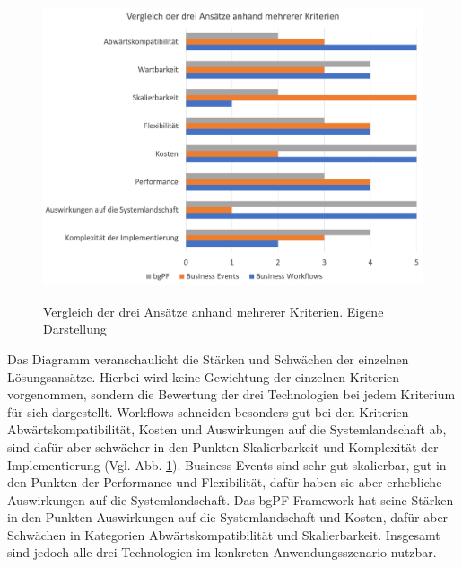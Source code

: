 \begin{figure}[H]
 \centering
 \includegraphics[height=9cm]{Bilder/Entscheidungsmatrix_Diagramm_2.png}
 \caption[Vergleich der drei Ansätze anhand mehrerer Kriterien]{Vergleich der drei Ansätze anhand mehrerer Kriterien. Eigene Darstellung}
 \label{fig:iso_norm_Diagramm}
\end{figure}

Das Diagramm veranschaulicht die Stärken und Schwächen der einzelnen Lösungsansätze. Hierbei wird keine Gewichtung der einzelnen Kriterien vorgenommen, sondern die Bewertung der drei Technologien bei jedem Kriterium für sich dargestellt. Workflows schneiden besonders gut bei den Kriterien Abwärtskompatibilität, Kosten und Auswirkungen auf die Systemlandschaft ab, sind dafür aber schwächer in den Punkten Skalierbarkeit und Komplexität der Implementierung (Vgl. Abb. \ref{fig:iso_norm_Diagramm}). Business Events sind sehr gut skalierbar, gut in den Punkten der Performance und Flexibilität, dafür haben sie aber erhebliche Auswirkungen auf die Systemlandschaft. Das bgPF Framework hat seine Stärken in den Punkten Auswirkungen auf die Systemlandschaft und Kosten, dafür aber Schwächen in Kategorien Abwärtskompatibilität und Skalierbarkeit. Insgesamt sind jedoch alle drei Technologien im konkreten Anwendungsszenario nutzbar.



